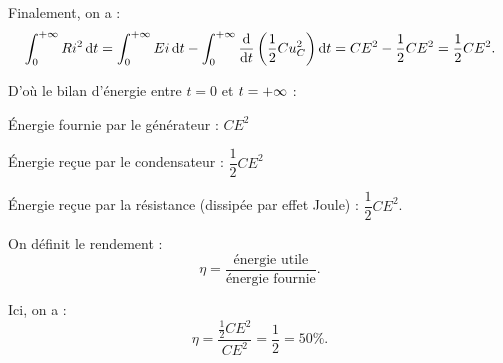 Finalement, on a : \[\int_0^{\pinf}Ri^2\odif{t}=\int_0^{\pinf}Ei\odif{t}-\int_0^{\pinf}\odv{}{t}\paren{\dfrac{1}{2}Cu_C^2}\odif{t}=CE^2-\dfrac{1}{2}CE^2=\dfrac{1}{2}CE^2.\]

D'où le bilan d'énergie entre \(t=0\) et \(t=+\infty\) : \begin{description}
\item Énergie fournie par le générateur : \(CE^2\)
\item Énergie reçue par le condensateur : \(\dfrac{1}{2}CE^2\)
\item Énergie reçue par la résistance (dissipée par effet Joule) : \(\dfrac{1}{2}CE^2\). \\
\end{description}

On définit le rendement : \[\eta=\dfrac{\text{énergie utile}}{\text{énergie fournie}}.\]

Ici, on a : \[\eta=\dfrac{\frac{1}{2}CE^2}{CE^2}=\dfrac{1}{2}=50\%.\]


